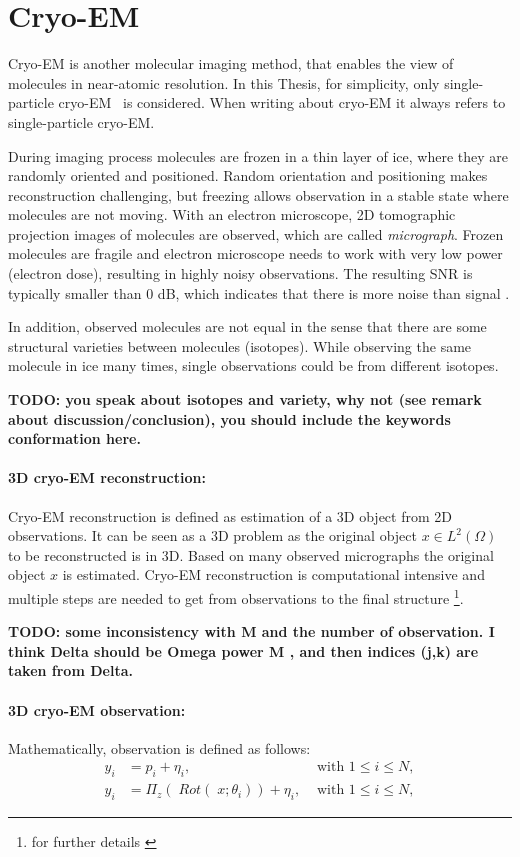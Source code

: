 \section{Cryo-EM}
Cryo-EM is another molecular imaging method, that enables the view of molecules in near-atomic resolution.
In this Thesis, for simplicity, only single-particle cryo-EM~\cite{singleParticleCryoEm} is considered.
When writing about cryo-EM it always refers to single-particle cryo-EM.

During imaging process molecules are frozen in a thin layer of ice, where they are randomly oriented and positioned. 
Random orientation and positioning makes reconstruction challenging, 
but freezing allows observation in a stable state where molecules are not moving.
With an electron microscope, 2D tomographic projection images of molecules are observed,
which are called \textit{micrograph}. 
Frozen molecules are fragile and electron microscope needs to work with
very low power (electron dose), resulting in highly noisy observations. The resulting SNR
is typically smaller than 0 dB, which indicates that there is more noise than signal \cite{cryoEmMath2}.

In addition, observed molecules are not equal in the sense that there are some structural varieties between
molecules (isotopes). While observing the same molecule in ice many times, single observations could be from different isotopes.

\textbf{TODO:  you speak about isotopes and variety, why not (see remark about discussion/conclusion), you should include the keywords conformation here.}


\paragraph{3D cryo-EM reconstruction:}
Cryo-EM reconstruction is defined as estimation of a 3D object from 2D observations.
It can be seen as a 3D problem as the original object $x \in L^2(\Omega)$ to be reconstructed is in 3D.
Based on many observed micrographs the original object $x$ is estimated.
Cryo-EM reconstruction is computational intensive and multiple steps are needed to get from 
observations to the final structure \footnote{for further details \cite{singleParticleCryoEm, cryoEmMath}}.


\textbf{TODO: some inconsistency with M and the number of observation. 
I think Delta should be Omega power M , and then indices (j,k) are taken from Delta.}

\paragraph{3D cryo-EM observation:}
Mathematically, observation is defined as follows:
\begin{equation}
    \label{eq:cryoEmSimple}
    \begin{aligned}
        y_i &= p_i + \eta_i, &\text{ with } 1 \leq i \leq N,\\
        y_i &= \Pi_z  (\; Rot (\;x; \theta_i )) + \eta_i, &\text{ with } 1 \leq i \leq N,    
    \end{aligned}
\end{equation}

